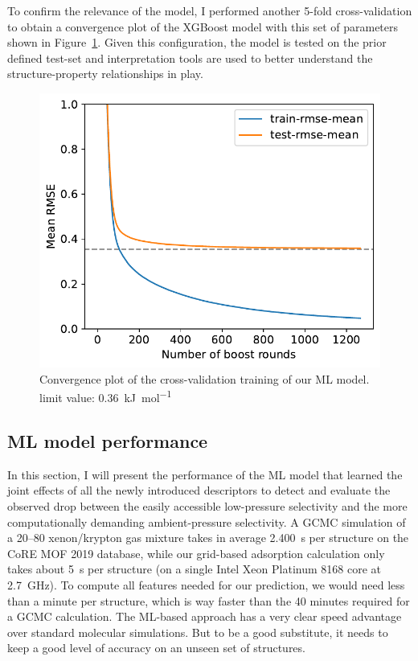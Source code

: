 \documentclass[main]{subfiles}
\begin{document}
To confirm the relevance of the model, I performed another 5-fold cross-validation to obtain a convergence plot of the XGBoost model with this set of parameters shown in Figure~\ref{fgr:convplot}. Given this configuration, the model is tested on the prior defined test-set and interpretation tools are used to better understand the structure-property relationships in play.

\begin{figure}[ht]
  \centering
    \includegraphics[width=0.60\linewidth]{figures/4-ml/SI_figure/convergence_plot.pdf}
    \caption{Convergence plot of the cross-validation training of our ML model. limit value: 0.36~\si{\kilo\joule\per\mole}}\label{fgr:convplot}
  \end{figure}

\subsection{ML model performance}

In this section, I will present the performance of the ML model that learned the joint effects of all the newly introduced descriptors to detect and evaluate the observed drop between the easily accessible low-pressure selectivity and the more computationally demanding ambient-pressure selectivity.
A GCMC simulation of a 20–80 xenon/krypton gas mixture takes in average \SI{2,400}{\second} per structure on the CoRE MOF 2019 database, while our grid-based adsorption calculation only takes about \SI{5}{\second} per structure (on a single Intel Xeon Platinum 8168 core at \SI{2.7}{\giga\hertz}). To compute all features needed for our prediction, we would need less than a minute per structure, which is way faster than the 40 minutes required for a GCMC calculation. The ML-based approach has a very clear speed advantage over standard molecular simulations. But to be a good substitute, it needs to keep a good level of accuracy on an unseen set of structures.
\end{document}
